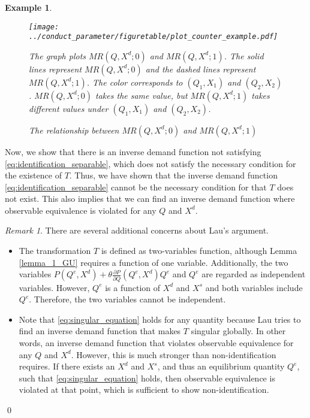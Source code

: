 \documentclass[11pt, a4paper]{article}
\newtheorem{example}{Example}
\theoremstyle{remark}
\newtheorem{remark}{Remark}
\begin{document}
\begin{example}
    \begin{figure}[th]
    \begin{center}
        \texttt{[image: ../conduct\_parameter/figuretable/plot\_counter\_example.pdf]}
        \caption{The relationship between $MR(Q,X^{d};0)$ and $MR(Q,X^{d};1)$}
        \label{fig:counterxample_demand_curves}
    \end{center}
    The graph plots $MR(Q,X^{d};0)$ and $MR(Q,X^{d};1)$.
    The solid lines represent $MR(Q,X^{d};0)$ and the dashed lines represent $MR(Q,X^{d};1)$.
    The color corresponds to $(Q_1, X_1)$ and $(Q_2, X_2)$.
    $MR(Q,X^{d};0)$ takes the same value, but $MR(Q,X^{d};1)$ takes different values under $(Q_1, X_1)$ and $(Q_2, X_2)$.
    \end{figure}
\end{example}

Now, we show that there is an inverse demand function not satisfying \eqref{eq:identification_separable}, which does not satisfy the necessary condition for the existence of $T$.
Thus, we have shown that the inverse demand function \eqref{eq:identification_separable} cannot be the necessary condition for that $T$ does not exist.
This also implies that we can find an inverse demand function where observable equivalence is violated for any $Q$ and $X^{d}$.



\begin{remark}
There are several additional concerns about Lau's argument.
\begin{itemize}
    \item The transformation $T$ is defined as two-variables function, although Lemma \ref{lemma_1_GU} requires a function of one variable.
    Additionally, the two variables $P(Q^e, X^{d}) + \theta \frac{\partial P}{\partial Q}(Q^e, X^{d}) Q^e$ and $Q^e$ are regarded as independent variables.
    However, $Q^e$ is a function of $X^{d}$ and $X^{s}$ and both variables include $Q^e$.
    Therefore, the two variables cannot be independent.
    \item Note that \eqref{eq:singular_equation} holds for any quantity because Lau tries to find an inverse demand function that makes $T$ singular globally.
    In other words, an inverse demand function that violates observable equivalence for any $Q$ and $X^{d}$.
    However, this is much stronger than non-identification requires. If there exists an $X^{d}$ and $X^{s}$, and thus an equilibrium quantity $Q^e$, such that \eqref{eq:singular_equation} holds, then observable equivalence is violated at that point, which is sufficient to show non-identification.
\end{itemize}
\qed
\end{remark}
\end{document}
